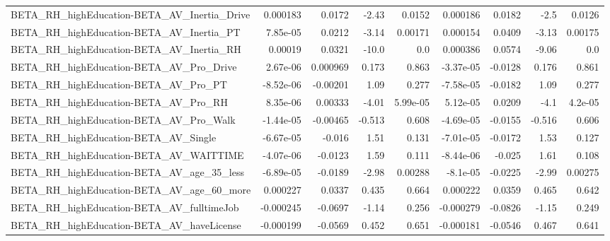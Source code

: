 \begin{tabular}{lrrrrrrrr}
BETA\_RH\_highEducation-BETA\_AV\_Inertia\_Drive        &    0.000183 &       0.0172 &    -2.43 &   0.0152 &   0.000186 &      0.0182 &         -2.5 &        0.0126 \\
BETA\_RH\_highEducation-BETA\_AV\_Inertia\_PT           &    7.85e-05 &       0.0212 &    -3.14 &  0.00171 &   0.000154 &      0.0409 &        -3.13 &       0.00175 \\
BETA\_RH\_highEducation-BETA\_AV\_Inertia\_RH           &     0.00019 &       0.0321 &    -10.0 &      0.0 &   0.000386 &      0.0574 &        -9.06 &           0.0 \\
BETA\_RH\_highEducation-BETA\_AV\_Pro\_Drive            &    2.67e-06 &     0.000969 &    0.173 &    0.863 &  -3.37e-05 &     -0.0128 &        0.176 &         0.861 \\
BETA\_RH\_highEducation-BETA\_AV\_Pro\_PT               &   -8.52e-06 &     -0.00201 &     1.09 &    0.277 &  -7.58e-05 &     -0.0182 &         1.09 &         0.277 \\
BETA\_RH\_highEducation-BETA\_AV\_Pro\_RH               &    8.35e-06 &      0.00333 &    -4.01 & 5.99e-05 &   5.12e-05 &      0.0209 &         -4.1 &       4.2e-05 \\
BETA\_RH\_highEducation-BETA\_AV\_Pro\_Walk             &   -1.44e-05 &     -0.00465 &   -0.513 &    0.608 &  -4.69e-05 &     -0.0155 &       -0.516 &         0.606 \\
BETA\_RH\_highEducation-BETA\_AV\_Single               &   -6.67e-05 &       -0.016 &     1.51 &    0.131 &  -7.01e-05 &     -0.0172 &         1.53 &         0.127 \\
BETA\_RH\_highEducation-BETA\_AV\_WAITTIME             &   -4.07e-06 &      -0.0123 &     1.59 &    0.111 &  -8.44e-06 &      -0.025 &         1.61 &         0.108 \\
BETA\_RH\_highEducation-BETA\_AV\_age\_35\_less          &   -6.89e-05 &      -0.0189 &    -2.98 &  0.00288 &   -8.1e-05 &     -0.0225 &        -2.99 &       0.00275 \\
BETA\_RH\_highEducation-BETA\_AV\_age\_60\_more          &    0.000227 &       0.0337 &    0.435 &    0.664 &   0.000222 &      0.0359 &        0.465 &         0.642 \\
BETA\_RH\_highEducation-BETA\_AV\_fulltimeJob          &   -0.000245 &      -0.0697 &    -1.14 &    0.256 &  -0.000279 &     -0.0826 &        -1.15 &         0.249 \\
BETA\_RH\_highEducation-BETA\_AV\_haveLicense          &   -0.000199 &      -0.0569 &    0.452 &    0.651 &  -0.000181 &     -0.0546 &        0.467 &         0.641 \\

\end{tabular}
